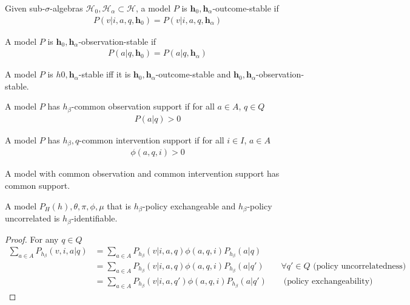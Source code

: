 \begin{definition}
Given sub-$\sigma$-algebras $\mathcal{H}_0,\mathcal{H}_\alpha\subset \mathcal{H}$, a model $P$ is $\mathbf{h}_0,\mathbf{h}_\alpha$-outcome-stable if
\begin{align}
    P(v|i,a,q,\mathbf{h}_0) = P(v|i,a,q,\mathbf{h}_\alpha)
\end{align}

A model $P$ is $\mathbf{h}_0,\mathbf{h}_\alpha$-observation-stable if
\begin{align}
    P(a|q,\mathbf{h}_0) = P(a|q,\mathbf{h}_\alpha)
\end{align}

A model $P$ is $h0,\mathbf{h}_\alpha$-stable iff it is $\mathbf{h}_0,\mathbf{h}_\alpha$-outcome-stable and $\mathbf{h}_0,\mathbf{h}_\alpha$-observation-stable.

\end{definition}

\begin{definition}[Common support]
A model $P$ has $h_\beta$-common observation support if for all $a\in A$, $q\in Q$
\begin{align}
    P(a|q) > 0
\end{align}

A model $P$ has $h_\beta,q$-common intervention support if for all $i\in I$, $a\in A$
\begin{align}
    \phi(a,q,i) > 0
\end{align}

A model with common observation and common intervention support has common support.
\end{definition}

\begin{theorem}
A model $P_H(h),\theta,\pi,\phi,\mu$ that is $h_\beta$-policy exchangeable and $h_\beta$-policy uncorrelated is $h_\beta$-identifiable.
\end{theorem}

\begin{proof}
For any $q\in Q$
\begin{align}
    \sum_{a\in A} P_{h_\beta}(v,i,a|q) &= \sum_{a\in A} P_{h_\beta}(v|i,a,q)\phi(a,q,i) P_{h_\beta}(a|q) \\
                             &= \sum_{a\in A} P_{h_\beta}(v|i,a,q) \phi(a,q,i) P_{h_\beta}(a|q')\qquad\forall q'\in Q\text{ (policy uncorrelatedness)}\\
                             &= \sum_{a\in A} P_{h_\beta}(v|i,a,q') \phi(a,q,i) P_{h_\beta}(a|q')\qquad\text{(policy exchangeability)}
\end{align}
\end{proof}

